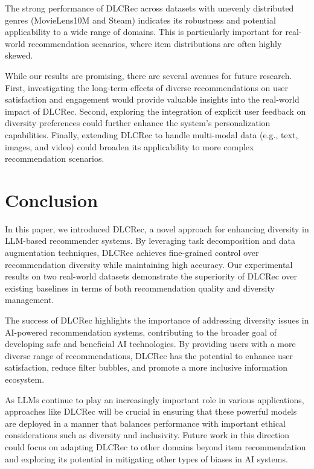 \documentclass[10pt,twocolumn,letterpaper]{article}
\begin{document}
The strong performance of DLCRec across datasets with unevenly distributed genres (MovieLens10M and Steam) indicates its robustness and potential applicability to a wide range of domains. This is particularly important for real-world recommendation scenarios, where item distributions are often highly skewed.

While our results are promising, there are several avenues for future research. First, investigating the long-term effects of diverse recommendations on user satisfaction and engagement would provide valuable insights into the real-world impact of DLCRec. Second, exploring the integration of explicit user feedback on diversity preferences could further enhance the system's personalization capabilities. Finally, extending DLCRec to handle multi-modal data (e.g., text, images, and video) could broaden its applicability to more complex recommendation scenarios.

\section{Conclusion}

In this paper, we introduced DLCRec, a novel approach for enhancing diversity in LLM-based recommender systems. By leveraging task decomposition and data augmentation techniques, DLCRec achieves fine-grained control over recommendation diversity while maintaining high accuracy. Our experimental results on two real-world datasets demonstrate the superiority of DLCRec over existing baselines in terms of both recommendation quality and diversity management.

The success of DLCRec highlights the importance of addressing diversity issues in AI-powered recommendation systems, contributing to the broader goal of developing safe and beneficial AI technologies. By providing users with a more diverse range of recommendations, DLCRec has the potential to enhance user satisfaction, reduce filter bubbles, and promote a more inclusive information ecosystem.

As LLMs continue to play an increasingly important role in various applications, approaches like DLCRec will be crucial in ensuring that these powerful models are deployed in a manner that balances performance with important ethical considerations such as diversity and inclusivity. Future work in this direction could focus on adapting DLCRec to other domains beyond item recommendation and exploring its potential in mitigating other types of biases in AI systems.
\end{document}
